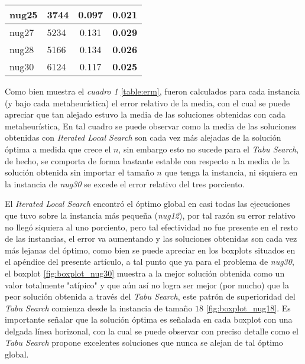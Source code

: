 \documentclass{ci5652}
\begin{document}
\begin{table}[ht]
\begin{tabular}{ll|c|c|}
  \multicolumn{1}{|l|}{nug25}              & 3744                              & 0.097                       & \textbf{0.021}             \\ \hline
  \multicolumn{1}{|l|}{nug27}              & 5234                              & 0.131                       & \textbf{0.029}             \\ \hline
  \multicolumn{1}{|l|}{nug28}              & 5166                              & 0.134                       & \textbf{0.026}             \\ \hline
  \multicolumn{1}{|l|}{nug30}              & 6124                              & 0.117                       & \textbf{0.025}             \\ \hline
    \end{tabular}
\end{table}

Como bien muestra el \textit{cuadro 1} \ref{table:erm}, fueron calculados para cada instancia (y bajo cada metaheurística) el error relativo de la media, con el cual se puede apreciar que tan alejado estuvo la media de las soluciones obtenidas con cada metaheurística, En tal cuadro se puede observar como la media de las soluciones obtenidas con \textit{Iterated Local Search} son cada vez más alejadas de la solución óptima a medida que crece el \(n\), sin embargo esto no sucede para el \textit{Tabu Search}, de hecho, se comporta de forma bastante estable con respecto a la media de la solución obtenida sin importar el tamaño \(n\) que tenga la instancia, ni siquiera en la instancia de \textit{nug30} se excede el error relativo del tres porciento. 

El \textit{Iterated Local Search} encontró el óptimo global en casi todas las ejecuciones que tuvo sobre la instancia más pequeña (\textit{nug12}), por tal razón su error relativo no llegó siquiera al uno porciento, pero tal efectividad no fue presente en el resto de las instancias, el error va aumentando y las soluciones obtenidas son cada vez más lejanas del óptimo, como bien se puede apreciar en los boxplots situados en el apéndice del presente artículo, a tal punto que ya para el problema de \textit{nug30}, el boxplot \ref{fig:boxplot_nug30} muestra a la mejor solución obtenida como un valor totalmente "atípico" y que aún así no logra ser mejor (por mucho) que la peor solución obtenida a través del \textit{Tabu Search}, este patrón de superioridad del \textit{Tabu Search} comienza desde la instancia de tamaño \(18\) \ref{fig:boxplot_nug18}. Es importante señalar que la solución óptima es señalada en cada boxplot con una delgada línea horizonal, con la cual se puede observar con preciso detalle como el \textit{Tabu Search} propone excelentes soluciones que nunca se alejan de tal óptimo global.
\end{document}
